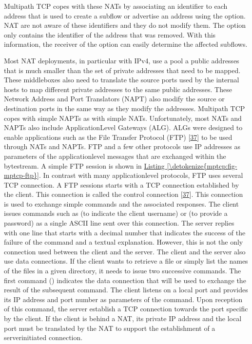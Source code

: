 \documentclass[letterpaper,10pt,english]{sphinxmanual}
\begin{document}
\sphinxAtStartPar
Multipath TCP copes with these NATs by associating an identifier to each address that is used to create a subflow or advertise an address using the  option. NAT are not aware of these identifiers and they do not modify them. The  option only contains the identifier of the address that was removed. With this information, the receiver of the option can easily determine the affected subflows.

\sphinxAtStartPar
Most NAT deployments, in particular with IPv4, use a pool a public addresses that is much smaller than the set of private addresses that need to be mapped. These middleboxes also need to translate the source ports used by the internal hosts to map different private addresses to the same public addresses. These Network Address and Port Translators (NAPT) also modify the source or destination ports in the same way as they modify the addresses. Multipath TCP copes with simple NAPTs as with simple NATs. Unfortunately, most NATs and NAPTs also include Application\sphinxhyphen{}Level Gateways (ALG). ALGs were designed to enable applications such as the File Transfer Protocol (FTP) {[}\hyperlink{cite.biblio:id894}{37}{]} to be used through NATs and NAPTs. FTP and a few other protocols use IP addresses as parameters of the application\sphinxhyphen{}level messages that are exchanged within the bytestream. A simple FTP session is shown in \hyperref[\detokenize{mptcp:fig-mptcp-ftp}]{Listing \ref{\detokenize{mptcp:fig-mptcp-ftp}}}. In contrast with many application\sphinxhyphen{}level protocols, FTP uses several TCP connection. A FTP sessions starts with a TCP connection established by the client. This connection is called the control connection {[}\hyperlink{cite.biblio:id894}{37}{]}. This connection is used to exchange simple commands and the associated responses. The client issues commands such as  (to indicate the client username) or  (to provide a password) as a single ASCII line sent over this connection. The server replies with one line that starts with a decimal number that indicates the success of the failure of the command and a textual explanation. However, this is not the only connection used between the client and the server. The client and the server also use data connections. If the client wants to retrieve a file or simply list the names of the files in a given directory, it needs to issue two successive commands. The first command () indicates the data connection that will be used to exchange the result of the subsequent command. The client listens on a local port and provides its IP address and port number as parameters of the  command. Upon reception of this command, the server establish a TCP connection towards the port specific by the client. If the client is behind a NAT, its private IP address and the local port must be translated by the NAT to support the establishment of a server\sphinxhyphen{}initiated connection.
\end{document}

